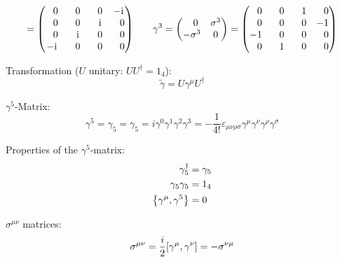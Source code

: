 \begin{equation}
\begin{aligned}
					= \left( \begin{matrix}
					\M 0 & \M 0 & \M 0 &  -\i \\
					\M 0 & \M 0 & \M\i & \M 0 \\
					\M 0 & \M\i & \M 0 & \M 0 \\
					-\i & \M 0 & \M 0 & \M 0 \\
					\end{matrix} \right)
					&\hspace{20pt}
					\gamma^3
					= \left( \begin{matrix}
					\M 0 & \sigma^3 \\
					-\sigma^3 &  0
					\end{matrix} \right)
					= \left( \begin{matrix}
					\M 0 & \M 0 & \M 1 & \M 0 \\
					\M 0 & \M 0 & \M 0 &   -1 \\
					-1 & \M 0 & \M 0 & \M 0 \\
					\M 0 & \M 1 & \M 0 & \M 0 \\
					\end{matrix} \right) \\
				\end{aligned}
			\end{equation}

			\noindent
			Transformation ($U$ unitary: $U U^\dagger=1_4$):
			\begin{equation}
				\tilde{\gamma} = U \gamma^\mu U^\dagger
			\end{equation}

			\noindent
			$\gamma^5$-Matrix:
			\begin{equation}
				\gamma^5 = \gamma_5 = \gamma_5 = i\gamma^0 \gamma^1 \gamma^2 \gamma^3 = -\frac{1}{4!}\varepsilon_{\mu\nu\rho\sigma} \gamma^\mu \gamma^\nu \gamma^\rho \gamma^\sigma
			\end{equation}

			\noindent
			Properties of the $\gamma^5$-matrix:
			\begin{equation}
				\begin{aligned}
					\gamma_5^\dagger &= \gamma_5 \\
					\gamma_5 \gamma_5 &= 1_4 \\
					\left\lbrace \gamma^\mu,\gamma^5 \right\rbrace &= 0 \\
				\end{aligned}
			\end{equation}

			\noindent
			$\sigma^{\mu\nu}$ matrices:
			\begin{equation}
				\sigma^{\mu\nu} = \frac{i}{2}\comm{\gamma^\mu}{\gamma^\nu} = -\sigma^{\nu\mu}
			\end{equation}

